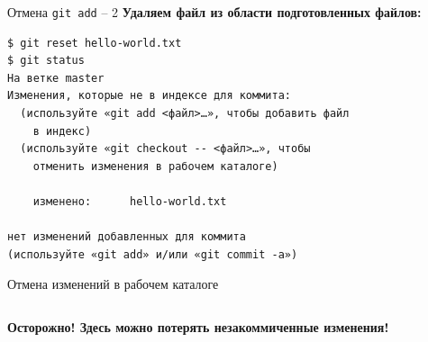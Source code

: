 \documentclass[presentation]{beamer}
\begin{document}
\begin{frame}[fragile]{Отмена \texttt{git add} -- 2}
  \textbf{Удаляем файл из области подготовленных файлов:}
\begin{verbatim}
$ git reset hello-world.txt
$ git status
На ветке master
Изменения, которые не в индексе для коммита:
  (используйте «git add <файл>…», чтобы добавить файл
    в индекс)
  (используйте «git checkout -- <файл>…», чтобы 
    отменить изменения в рабочем каталоге)

	изменено:      hello-world.txt

нет изменений добавленных для коммита
(используйте «git add» и/или «git commit -a»)
\end{verbatim}
\end{frame}

\begin{frame}[fragile]{Отмена изменений в рабочем каталоге}
  \begin{columns}
    \begin{column}{0.6\textwidth}
  \alert{\textbf{Осторожно!  Здесь можно потерять незакоммиченные
      изменения!}}\newline\newline


\end{column}
\end{columns}
\end{frame}
\end{document}
